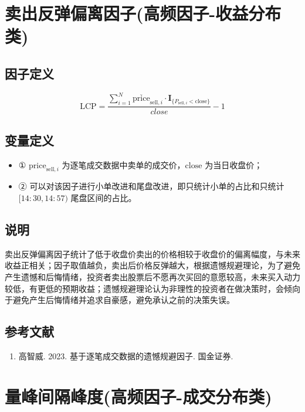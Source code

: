 \documentclass{article}
\begin{document}
\section{卖出反弹偏离因子(高频因子-收益分布类)}

\subsection{因子定义}
\begin{equation}
    \mathrm{LCP} = \frac{\sum_{i=1}^{N} \overline{\mathrm{price}}_{\mathrm{sell},i} \cdot \mathbf{I}_{\{P_{\mathrm{sell},i} < \mathrm{close}\}}}{close} - 1
\end{equation}

\subsection{变量定义}
\begin{itemize}
    \item ① \( \mathrm{price}_{\mathrm{sell},i} \) 为逐笔成交数据中卖单的成交价，\( \mathrm{close} \) 为当日收盘价；
    \item ② 可以对该因子进行小单改进和尾盘改进，即只统计小单的占比和只统计 \([14:30,14:57)\) 尾盘区间的占比。
\end{itemize}

\subsection{说明}
卖出反弹偏离因子统计了低于收盘价卖出的价格相较于收盘价的偏离幅度，与未来收益正相关；因子取值越负，卖出后价格反弹越大，根据遗憾规避理论，为了避免产生遗憾和后悔情绪，投资者卖出股票后不愿再次买回的意愿较高，未来买入动力较低，有更低的预期收益；遗憾规避理论认为非理性的投资者在做决策时，会倾向于避免产生后悔情绪并追求自豪感，避免承认之前的决策失误。

\subsection{参考文献}
\begin{enumerate}
    \item 高智威. 2023. 基于逐笔成交数据的遗憾规避因子. 国金证券.
\end{enumerate}

\section{量峰间隔峰度(高频因子-成交分布类)}
\end{document}
